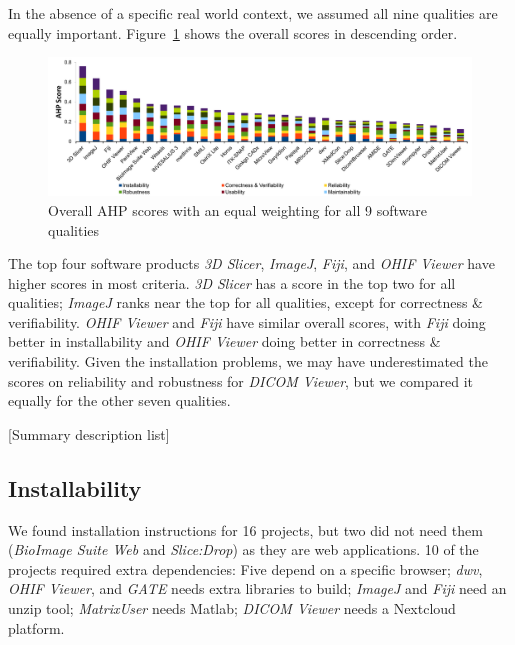 \documentclass[final, 12pt, 3p, times]{elsarticle}
\begin{document}
In the absence of
a specific real world context, we assumed all nine qualities are equally
important. Figure~\ref{fg_overall_scores} shows the overall scores in descending
order.

\begin{figure}[!ht]
\includegraphics[scale=0.38]{overall_scores.pdf}
\caption{Overall AHP scores with an equal weighting for all 9 software qualities}

\label{fg_overall_scores}
\end{figure}

The top four software products \textit{3D Slicer}, \textit{ImageJ},
\textit{Fiji}, and \textit{OHIF Viewer} have higher scores in most criteria.
\textit{3D Slicer} has a score in the top two for all qualities; \textit{ImageJ}
ranks near the top for all qualities, except for correctness \& verifiability.
\textit{OHIF Viewer} and \textit{Fiji} have similar overall scores, with
\textit{Fiji} doing better in installability and \textit{OHIF Viewer} doing
better in correctness \& verifiability.  Given the installation problems, we may
have underestimated the scores on reliability and robustness for \textit{DICOM
Viewer}, but we compared it equally for the other seven qualities.

[Summary description list]

\subsection{Installability} \label{sec_result_installability}

We found
installation instructions for 16 projects, but two did not need them
(\textit{BioImage Suite Web} and \textit{Slice:Drop})
as they are web applications. 10 of the projects required extra
dependencies: Five depend on a specific browser; \textit{dwv}, \textit{OHIF
Viewer}, and \textit{GATE} needs extra libraries to build; \textit{ImageJ} and
\textit{Fiji} need an unzip tool; \textit{MatrixUser} needs Matlab;
\textit{DICOM Viewer} needs a Nextcloud platform.
\end{document}

